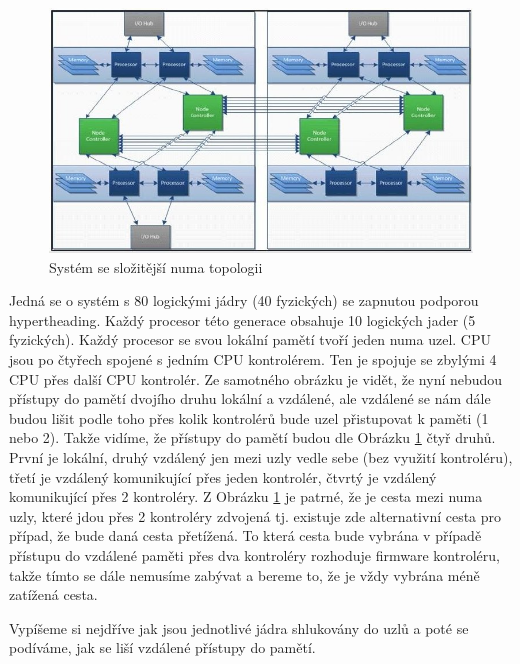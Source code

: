 \documentclass[a4paper,12pt]{article}
\begin{document}
\begin{figure}[ht]
\includegraphics[scale=0.7]{obrazky/numa-scheme-big-system.jpeg}
\caption{Systém se složitější numa topologii}
\label{numa scheme2}
\end{figure}


Jedná se o systém s 80 logickými jádry (40 fyzických) se zapnutou podporou hypertheading. Každý procesor této generace obsahuje 10 logických jader (5 fyzických). Každý procesor se svou lokální pamětí tvoří jeden numa uzel. CPU jsou po čtyřech spojené s jedním CPU kontrolérem. Ten je spojuje se zbylými 4 CPU přes další CPU kontrolér. Ze samotného obrázku je vidět, že nyní nebudou přístupy do pamětí dvojího druhu lokální a vzdálené, ale vzdálené se nám dále budou lišit podle toho přes kolik kontrolérů bude uzel přistupovat k paměti (1 nebo 2). Takže vidíme, že přístupy do pamětí budou dle Obrázku \ref{numa scheme2} čtyř druhů. První je lokální, druhý vzdálený jen mezi uzly vedle sebe (bez využití kontroléru), třetí je vzdálený komunikující přes jeden kontrolér, čtvrtý je vzdálený komunikující přes 2 kontroléry. Z Obrázku \ref{numa scheme2} je patrné, že je cesta mezi numa uzly, které jdou přes 2 kontroléry zdvojená tj. existuje zde alternativní cesta pro případ, že bude daná cesta přetížená. To která cesta bude vybrána v případě přístupu do vzdálené paměti přes dva kontroléry rozhoduje firmware kontroléru, takže tímto se dále nemusíme zabývat a bereme to, že je vždy vybrána méně zatížená cesta.

\newpage
Vypíšeme si nejdříve jak jsou jednotlivé jádra shlukovány do uzlů a poté se podíváme, jak se liší vzdálené přístupy do pamětí.
\end{document}
